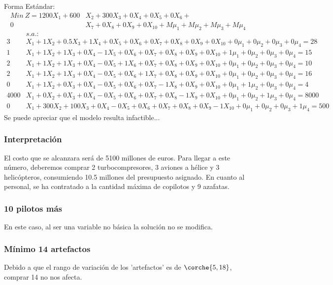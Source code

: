 \begin{homeworkProblem}
Forma Estándar:{\footnotesize
\begin{align*}
    Min\ Z = 1200X_1 + 600&X_2 + 300X_3 + 0X_4 + 0X_5 + 0X_6 + \\ 0&X_7 + 0X_8 + 0X_9 + 0X_{10} + M\mu_1 + M\mu_2 + M\mu_3 + M\mu_4
\end{align*}  
\begin{align*} 
    &s.a.: \\ 3&X_1 + 1X_2 + 0.5X_3 + 1X_4 + 0X_5 + 0X_6 + 0X_7 + 0X_8 + 0X_9 + 0X_{10} + 0\mu_1 + 0\mu_2 + 0\mu_3 + 0\mu_4  = 28 \\
    1&X_1 + 1X_2 + 1X_3 + 0X_4 - 1X_5 + 0X_6 + 0X_7 + 0X_8 + 0X_9 + 0X_{10} + 1\mu_1 + 0\mu_2 + 0\mu_3 + 0\mu_4  = 15 \\
    2&X_1 + 1X_2 + 1X_3 + 0X_4 - 0X_5 + 1X_6 + 0X_7 + 0X_8 + 0X_9 + 0X_{10} + 0\mu_1 + 0\mu_2 + 0\mu_3 + 0\mu_4  = 10 \\
    2&X_1 + 1X_2 + 1X_3 + 0X_4 - 0X_5 + 0X_6 + 1X_7 + 0X_8 + 0X_9 + 0X_{10} + 0\mu_1 + 0\mu_2 + 0\mu_3 + 0\mu_4  = 16 \\
    0&X_1 + 1X_2 + 0X_3 + 0X_4 - 0X_5 + 0X_6 + 0X_7 - 1X_8 + 0X_9 + 0X_{10} + 0\mu_1 + 1\mu_2 + 0\mu_3 + 0\mu_4  = 4 \\
    4000&X_1 + 0X_2 + 0X_3 + 0X_4 - 0X_5 + 0X_6 + 0X_7 + 0X_8 - 1X_9 + 0X_{10} + 0\mu_1 + 0\mu_2 + 1\mu_3 + 0\mu_4  = 8000 \\
    0&X_1 + 300X_2 + 100X_3 + 0X_4 - 0X_5 + 0X_6 + 0X_7 + 0X_8 + 0X_9 -  1X_{10} + 0\mu_1 + 0\mu_2 + 0\mu_3 + 1\mu_4  = 500 
\end{align*}}
Se puede apreciar que el modelo resulta infactible...
\subsubsection{Interpretación}
El costo que se alcanzara será de 5100 millones de euros. Para llegar a este número, deberemos comprar 2 turbocompresores, 3 aviones a hélice y 3 helicópteros, consumiendo 10.5 millones del presupuesto asignado. En cuanto al personal, se ha contratado a la cantidad máxima de copilotos y 9 azafatas.
\subsubsection{10 pilotos más}
En este caso, al ser una variable no básica la solución no se modifica.
\subsubsection{Mínimo 14 artefactos}
Debido a que el rango de variación de los 'artefactos' es de $\corche{5,18}$, comprar 14 no nos afecta.
\end{homeworkProblem}